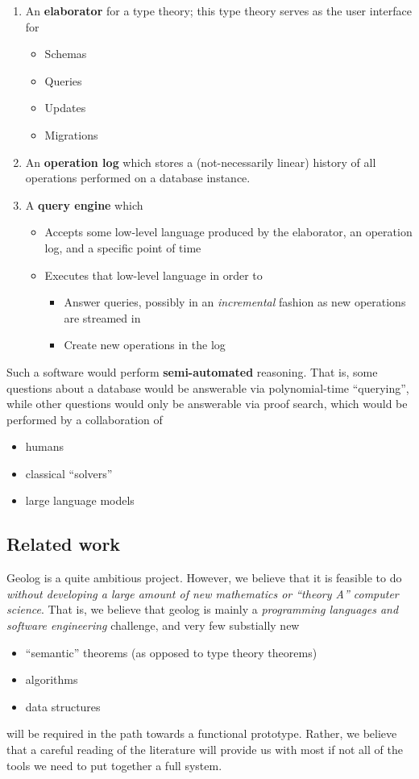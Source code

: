 \documentclass{article}
\begin{document}
\begin{enumerate}
\item An \textbf{elaborator} for a type theory; this type theory serves as the user interface for
\begin{itemize}
\item Schemas
\item Queries
\item Updates
\item Migrations
\end{itemize}
\item An \textbf{operation log} which stores a (not-necessarily linear) history of all operations performed on a database instance.
\item A \textbf{query engine} which
\begin{itemize}
\item Accepts some low-level language produced by the elaborator, an operation log, and a specific point of time
\item Executes that low-level language in order to
\begin{itemize}
\item Answer queries, possibly in an \emph{incremental} fashion as new operations are streamed in
\item Create new operations in the log
\end{itemize}
\end{itemize}
\end{enumerate}

Such a software would perform \textbf{semi-automated} reasoning. That is, some questions about a database would be answerable via polynomial-time ``querying'', while other questions would only be answerable via proof search, which would be performed by a collaboration of

\begin{itemize}
\item humans
\item classical ``solvers''
\item large language models
\end{itemize}
\subsection{Related work}
Geolog is a quite ambitious project. However, we believe that it is feasible to do \emph{without developing a large amount of new mathematics or ``theory A'' computer science}. That is, we believe that geolog is mainly a \emph{programming languages and software engineering} challenge, and very few substially new
\begin{itemize}
\item ``semantic'' theorems (as opposed to type theory theorems)
\item algorithms
\item data structures
\end{itemize}
will be required in the path towards a functional prototype. Rather, we believe that a careful reading of the literature will provide us with most if not all of the tools we need to put together a full system.
\end{document}
